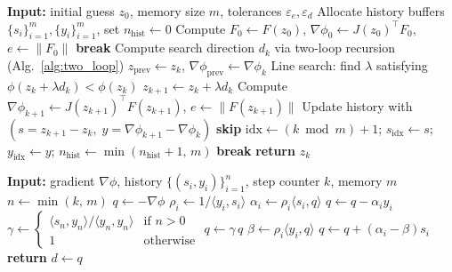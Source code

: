 \documentclass[11pt,a4paper]{article}
\begin{document}
\begin{algorithm}[ht]
\caption{L-BFGS for $\min_z \frac{1}{2}\|F(z)\|^2$}
\label{alg:lbfgs_opt}
\begin{algorithmic}[1]
\State \textbf{Input:} initial guess $z_0$, memory size $m$, tolerances $\varepsilon_e, \varepsilon_d$
\State Allocate history buffers $\{s_i\}_{i=1}^m, \{y_i\}_{i=1}^m$, set $n_{\text{hist}} \gets 0$
\State Compute $F_0 \gets F(z_0)$, $\nabla\phi_0 \gets J(z_0)^\top F_0$, $e \gets \|F_0\|$
     \State \textbf{break} \EndIf
    \State Compute search direction $d_k$ via two-loop recursion (Alg.~\ref{alg:two_loop})
    \State $z_{\text{prev}} \gets z_k$, \; $\nabla\phi_{\text{prev}} \gets \nabla\phi_k$
    \State Line search: find $\lambda$ satisfying $\phi(z_k + \lambda d_k) < \phi(z_k)$
    \State $z_{k+1} \gets z_k + \lambda d_k$
    \State Compute $\nabla\phi_{k+1} \gets J(z_{k+1})^\top F(z_{k+1})$, \; $e \gets \|F(z_{k+1})\|$
    \State Update history with $(s = z_{k+1}-z_k,\; y = \nabla\phi_{k+1}-\nabla\phi_k)$
     \State \textbf{skip} \EndIf
    \State $\text{idx} \gets (k \bmod m) + 1$; \; $s_{\text{idx}} \gets s$; \; $y_{\text{idx}} \gets y$; \; $n_{\text{hist}} \gets \min(n_{\text{hist}}+1,\, m)$
     \State \textbf{break} \EndIf
\EndFor
\State \textbf{return} $z_k$
\end{algorithmic}
\end{algorithm}

\begin{algorithm}[ht]
\caption{L-BFGS two-loop recursion --- computes $d = -H_k^{-1}\nabla\phi$}
\label{alg:two_loop}
\begin{algorithmic}[1]
\State \textbf{Input:} gradient $\nabla\phi$, history $\{(s_i,y_i)\}_{i=1}^{n}$, step counter $k$, memory $m$
\State $n \gets \min(k,\, m)$ 
\State $q \gets -\nabla\phi$
 
    \State $\rho_i \gets 1 / \langle y_i, s_i \rangle$
    \State $\alpha_i \gets \rho_i \langle s_i, q \rangle$
    \State $q \gets q - \alpha_i y_i$
\EndFor
\State $\gamma \gets \begin{cases} \langle s_n, y_n \rangle / \langle y_n, y_n \rangle & \text{if } n > 0 \\ 1 & \text{otherwise} \end{cases}$ 
\State $q \gets \gamma\, q$
 
    \State $\beta \gets \rho_i \langle y_i, q \rangle$
    \State $q \gets q + (\alpha_i - \beta) s_i$
\EndFor
\State \textbf{return} $d \gets q$
\end{algorithmic}
\end{algorithm}
\end{document}
